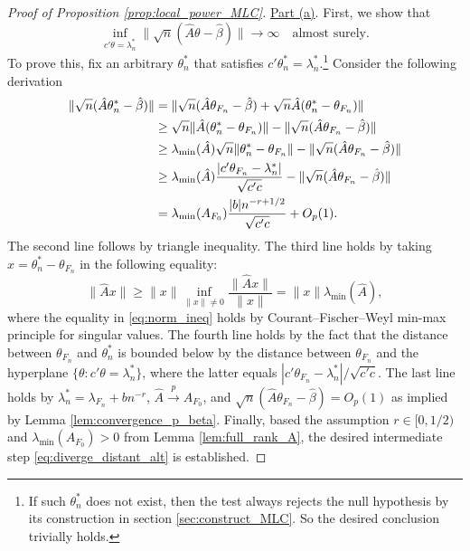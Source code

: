 \documentclass[11pt]{article}
\theoremstyle{definition}
\newcommand{\0}{\ensuremath{\mathbf{0}}}
\begin{document}
\begin{bibunit}
%
\begin{proof}[Proof of Proposition \ref{prop:local_power_MLC}]
    \underline{Part (a)}. First, we show that 
        \begin{equation}
        \label{eq:diverge_distant_alt}
            \inf_{c'\theta = \lambda_n^*} \|\sqrt{n}(\hat{A}\theta - \hat{\beta})\| \to \infty \quad \text{almost surely}.
        \end{equation}
    To prove this, fix an arbitrary $\theta_n^*$ that satisfies $c'\theta_n^* = \lambda_n^*$.\footnote{If such $\theta_n^*$ does not exist, then the test always rejects the null hypothesis by its construction in section \ref{sec:construct_MLC}. So the desired conclusion trivially holds.} Consider the following derivation
    \begin{align}
        \|\sqrt{n}(\hat{A}\theta_n^* - \hat{\beta})\|
        &= \|\sqrt{n}(\hat{A}\theta_{F_n} - \hat{\beta}) + \sqrt{n}\hat{A}(\theta_{n}^* - \theta_{F_n})\| \notag \\
        &\geq \sqrt{n}\|\hat{A}(\theta_n^* - \theta_{F_n})\| - \|\sqrt{n}(\hat{A}\theta_{F_n} - \hat{\beta})\| \notag \\
        &\geq \lambda_{\min}(\hat{A}) \sqrt{n}\|\theta_n^* - \theta_{F_n}\| - \|\sqrt{n}(\hat{A}\theta_{F_n} - \hat{\beta})\| \label{eq:bound_on_diff_theta} \\
        &\geq \lambda_{\min}(\hat{A}) \frac{|c'\theta_{F_n} - \lambda_{n}^*|}{\sqrt{c'c}} - \|\sqrt{n}(\hat{A}\theta_{F_n} - \hat{\beta})\| \notag \\
        &= \lambda_{\min}(A_{F_0}) \frac{|b|n^{-r+1/2}}{\sqrt{c'c}} + O_p(1). \notag
    \end{align}
    The second line follows by triangle inequality. The third line holds by taking $x = \theta_n^* - \theta_{F_n}$ in the following equality: 
    \begin{equation}
    \label{eq:norm_ineq}
        \|\hat{A}x\| \geq \|x\| \inf_{\|x\| \neq 0}\frac{\|\hat{A}x\|}{\|x\|} = \|x\| \lambda_{\min}(\hat{A}),
    \end{equation}
    where the equality in \eqref{eq:norm_ineq} holds by Courant–Fischer–Weyl min-max principle for singular values.
    The fourth line holds by the fact that the distance between $\theta_{F_n}$ and $\theta_{n}^*$ is bounded below by the distance between $\theta_{F_n}$ and the hyperplane $\{\theta: c'\theta = \lambda_n^*\}$, where the latter equals $|c'\theta_{F_n} - \lambda_n^*|/\sqrt{c'c}$. The last line holds by $\lambda_n^* = \lambda_{F_n} + bn^{-r}$, $\hat{A} \xrightarrow{p} A_{F_0}$, and $\sqrt{n}(\hat{A}\theta_{F_n} - \hat{\beta}) = O_p(1)$ as implied by Lemma \ref{lem:convergence_p_beta}. Finally, based the assumption $r \in [0,1/2)$ and $\lambda_{\min}(A_{F_0}) > 0$ from  Lemma \ref{lem:full_rank_A}, the desired intermediate step \eqref{eq:diverge_distant_alt} is established.
    

\end{proof}
\end{bibunit}
\end{document}
